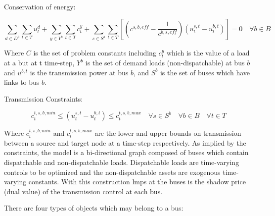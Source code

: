 \documentclass[12pt]{article}
\begin{document}
Conservation of energy:

\begin{equation}
	\sum_{d\in D^b}\sum_{t\in T}u^{d}_t + \sum_{y\in Y^b}\sum_{t\in T}c^{y}_t + \sum_{s\in S^b}\sum_{t\in T} \left[\left(c^{s,b,eff}-\frac{1}{c^{b,s,eff}}\right)(u^{s,t}_t-u^{b,t}_t)\right] = 0 \quad\forall b\in B
\end{equation}

Where $C$ is the set of problem constants including $c^{y}_t$ which is the value of a load at a but at t time-step, $Y^b$ is the set of demand loads (non-dispatchable) at bus $b$ and $u^{b,t}$ is the transmission power at bus $b$, and $S^b$ is the set of buses which have links to bus $b$.

Transmission Constraints:

\begin{equation}
	c^{t,s,b,min}_t \leq (u^{s,t}_t-u^{b,t}_t) \leq c^{t,s,b,max}_t \quad\forall s\in S^b\quad\forall b\in B\quad\forall t\in T
\end{equation}

Where $c^{t,s,b,min}_t$ and $c^{t,s,b,max}_t$ are the lower and upper bounds on transmission between a source and target node at a time-step respectively. As implied by the constraints, the model is a bi-directional graph composed of buses which contain dispatchable and non-dispatchable loads. Dispatchable loads are time-varying controls to be optimized and the non-dispatchable assets are exogenous time-varying constants. With this construction \glspl{lmp} at the buses is the shadow price (dual value) of the transmission control at each bus.

There are four types of objects which may belong to a bus:
\end{document}
